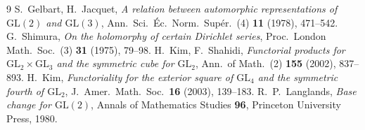 \documentclass[11pt]{article}
\begin{document}
\begin{thebibliography}{9}
 S.~Gelbart, H.~Jacquet,
\emph{A relation between automorphic representations of $\mathrm{GL}(2)$ and
$\mathrm{GL}(3)$}, Ann.\ Sci.\ \'Ec.\ Norm.\ Sup\'er.\ (4) \textbf{11} (1978), 471--542.
 G.~Shimura,
\emph{On the holomorphy of certain Dirichlet series},
Proc.\ London Math.\ Soc.\ (3) \textbf{31} (1975), 79--98.
 H.~Kim, F.~Shahidi,
\emph{Functorial products for $\mathrm{GL}_2\times\mathrm{GL}_3$ and the symmetric cube
for $\mathrm{GL}_2$}, Ann.\ of Math.\ (2) \textbf{155} (2002), 837--893.
 H.~Kim,
\emph{Functoriality for the exterior square of $\mathrm{GL}_4$ and the symmetric fourth
of $\mathrm{GL}_2$}, J.\ Amer.\ Math.\ Soc.\ \textbf{16} (2003), 139--183.
 R.~P.~Langlands,
\emph{Base change for $\mathrm{GL}(2)$}, Annals of Mathematics Studies \textbf{96},
Princeton University Press, 1980.
\end{thebibliography}
\end{document}
